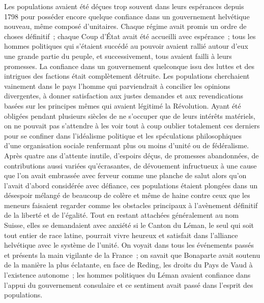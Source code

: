 \documentclass[french,twoside]{book} %
\begin{document}
Les populations avaient été déçues trop souvent dans leurs espérances depuis 1798 pour posséder encore quelque confiance dans un gouvernement helvétique nouveau, même composé d’unitaires. Chaque régime avait promis un ordre de choses définitif ; chaque Coup d’État avait été accueilli avec espérance ; tous les hommes politiques qui s’étaient succédé au pouvoir avaient rallié autour d’eux une grande partie du peuple, et successivement, tous avaient failli à leurs promesses. La confiance dans un gouvernement quelconque issu des luttes et des intrigues des factions était complètement détruite. Les populations cherchaient vainement dans le pays l’homme qui parviendrait à concilier les opinions divergentes, à donner satisfaction aux justes demandes et aux revendications basées sur les principes mêmes qui avaient légitimé la Révolution. Ayant été obligées pendant plusieurs siècles de ne s’occuper que de leurs intérêts matériels, on ne pouvait pas s’attendre à les voir tout à coup oublier totalement ces derniers pour se confiner dans l’idéalisme politique et les spéculations philosophiques d’une organisation sociale renfermant plus ou moins d’unité ou de fédéralisme. Après quatre ans d’attente inutile, d’espoirs déçus, de promesses abandonnées, de contributions aussi variées qu’écrasantes, de dévouement infructueux à une cause que l’on avait embrassée avec ferveur comme une planche de salut alors qu’on l’avait d’abord considérée avec défiance, ces populations étaient plongées dans un désespoir mélangé de beaucoup de colère et même de haine contre ceux que les meneurs faisaient regarder comme les obstacles principaux à l’avènement définitif de la liberté et de l’égalité. Tout en restant attachées généralement au nom Suisse, elles se demandaient avec anxiété si le Canton du Léman, le seul qui soit tout entier de race latine, pourrait vivre heureux et satisfait dans l’alliance helvétique avec le système de l’unité. On voyait dans tous les événements passés et présents la main vigilante de la France ; on savait que Bonaparte avait soutenu de la manière la plus éclatante, en face de Reding, les droits du Pays de Vaud à l’existence autonome ; les hommes politiques du Léman avaient confiance dans l’appui du gouvernement consulaire et ce sentiment avait passé dans l’esprit des populations.\par
\end{document}
